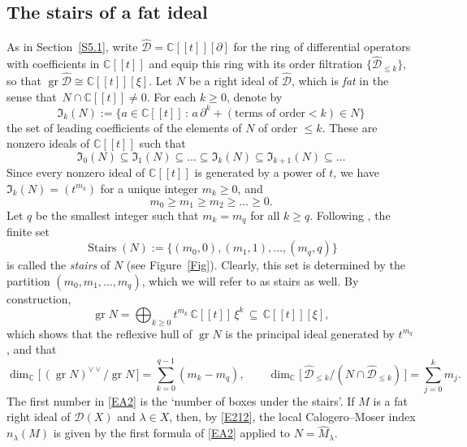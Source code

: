 \documentclass[11pt,reqno]{amsart}
\theoremstyle{plain}
\theoremstyle{definition}
\theoremstyle{remark}
\numberwithin{equation}{section}
\newcommand{\cD}{\mathcal{D}}
\newcommand{\C}{\mathbb{C}}
\newcommand{\del}{\partial}
\newcommand{\hD}{\widehat{\cD}}
\DeclareMathOperator{\gr}{gr}
\DeclareMathOperator{\Stairs}{Stairs}
\begin{document}
\subsection{The stairs of a fat ideal}
\label{SA.1}
As in Section~\ref{S5.1}, write $\hD = \C[[t]][\del]$ for the ring of differential operators with coefficients in $ \C[[t]]$ and equip this ring with its order filtration $\{\hD_{\le k}\}$,
so that $\gr \hD \cong \C[[t]][\xi]$. Let $N$ be a right ideal of $\hD$, which is \emph{fat} in the sense that  $\,N \cap \C[[t]] \ne 0$. For each $k \ge 0$, denote by
\[
  \mathfrak{I}_k(N) := \{ a \in \C[[t]] \, : \, a\, \del^k + (\text{terms of order} < k) \in N \}
\]
the set of leading coefficients of the elements of $N$ of order $\le k$. These are nonzero ideals of $\C[[t]]$ such that 
%
$$
\mathfrak{I}_0(N) \subseteq \mathfrak{I}_{1}(N) \subseteq \ldots \subseteq \mathfrak{I}_k(N) \subseteq \mathfrak{I}_{k+1}(N) \subseteq \ldots
$$
%
Since every nonzero ideal of $\C[[t]]$ is
generated by a power of $t$, we have $\mathfrak{I}_k(N) = (t^{m_k})$ for a unique integer
$m_k \ge 0$, and
\[
  m_0 \ge m_1 \ge m_2 \ge \ldots \ge 0 .
\]
Let $q$ be the smallest integer such that $m_k = m_q$ for all $k \ge q$. Following \cite{BM84}, the finite set
\[
  \Stairs(N) := \{ (m_0, 0), (m_1, 1), \ldots, (m_q, q) \}
\]
is called the \emph{stairs} of $N$ (see Figure~\ref{Fig}). Clearly, this set is determined by
the partition $ (m_0, m_1, \ldots, m_q) $, which we will refer to as stairs as well. By construction,
\begin{equation}
\label{EA1}
  \gr N = \bigoplus_{k \ge 0} t^{m_k}\, \C[[t]]\, \xi^k \, \subseteq \, \C[[t]][\xi] ,
\end{equation}
which shows that the reflexive hull of $\gr N$ is the principal ideal generated by $t^{m_q}$,
and that
\begin{equation}
\label{EA2}
  \dim_{\C}\bigl[\, (\gr N)^{\vee\vee}\! / \gr N \,\bigr] = \sum_{k=0}^{q-1} (m_k - m_q) , \qquad
  \dim_{\C}\bigl[\, \hD_{\le k}/(N \cap \hD_{\le k}) \,\bigr] = \sum_{j=0}^{k} m_j .
\end{equation}
The first number in \eqref{EA2} is the `number of boxes under the stairs'. If $M$ is a fat right
ideal of $\cD(X)$ and $\lambda \in X$, then, by \eqref{E212}, the local Calogero--Moser index
$n_\lambda(M)$ is given by the first formula of \eqref{EA2} applied to $N = \widehat{M}_\lambda$.
\end{document}
